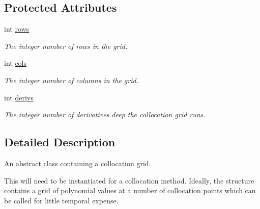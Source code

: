 \subsection*{Protected Attributes}
\begin{DoxyCompactItemize}
\item 
\hypertarget{classcollocation_1_1collocation__grid_ac1091b01caad2cb238586116ac51852d}{int \hyperlink{classcollocation_1_1collocation__grid_ac1091b01caad2cb238586116ac51852d}{rows}}\label{classcollocation_1_1collocation__grid_ac1091b01caad2cb238586116ac51852d}

\begin{DoxyCompactList}\small\item\em The integer number of rows in the grid. \end{DoxyCompactList}\item 
\hypertarget{classcollocation_1_1collocation__grid_ae2fe5a4cc61080740c692bcfa13730fb}{int \hyperlink{classcollocation_1_1collocation__grid_ae2fe5a4cc61080740c692bcfa13730fb}{cols}}\label{classcollocation_1_1collocation__grid_ae2fe5a4cc61080740c692bcfa13730fb}

\begin{DoxyCompactList}\small\item\em The integer number of columns in the grid. \end{DoxyCompactList}\item 
\hypertarget{classcollocation_1_1collocation__grid_a37941e925c4f43a83206b2be70a5d63b}{int \hyperlink{classcollocation_1_1collocation__grid_a37941e925c4f43a83206b2be70a5d63b}{derivs}}\label{classcollocation_1_1collocation__grid_a37941e925c4f43a83206b2be70a5d63b}

\begin{DoxyCompactList}\small\item\em The integer number of derivatives deep the collocation grid runs. \end{DoxyCompactList}\end{DoxyCompactItemize}


\subsection{Detailed Description}
An abstract class containing a collocation grid. 



 This will need to be instantiated for a collocation method. Ideally, the structure contains a grid of polynomial values at a number of collocation points which can be called for little temporal expense. 

